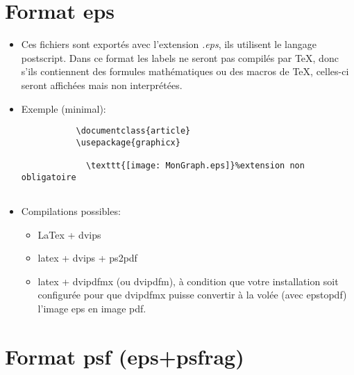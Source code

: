 \section{Format eps}

\begin{itemize}

\item Ces fichiers sont exportés avec l'extension \textit{.eps}, ils utilisent le langage postscript. Dans ce format les labels ne seront pas compilés par TeX, donc s'ils contiennent des formules mathématiques ou des macros de TeX, celles-ci seront affichées mais non interprétées.

\item Exemple (minimal):

\begin{verbatim}
           \documentclass{article}
           \usepackage{graphicx}
            
             \texttt{[image: MonGraph.eps]}%extension non obligatoire
           
\end{verbatim}
\item Compilations possibles:
\begin{itemize}
\item LaTex + dvips
\item latex + dvips + ps2pdf
\item latex + dvipdfmx (ou dvipdfm), à condition que votre installation soit configurée pour que dvipdfmx puisse convertir à la volée (avec epstopdf) l'image eps en image pdf. 
\end{itemize}

\end{itemize}

\section{Format psf (eps+psfrag)}

